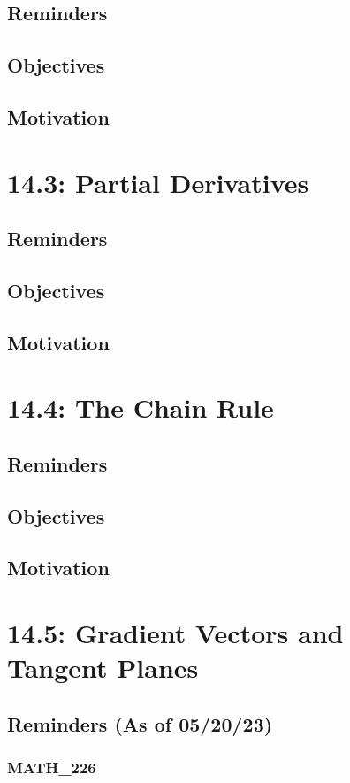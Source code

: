 \documentclass{report}
\begin{document}
\begin{sloppypar}
\section{Reminders}
\section{Objectives}
\section{Motivation}
\chapter{14.3: Partial Derivatives}
\section{Reminders}
\section{Objectives}
\section{Motivation}
\chapter{14.4: The Chain Rule}
\section{Reminders}
\section{Objectives}
\section{Motivation}
\chapter{14.5: Gradient Vectors and Tangent Planes}
\section{Reminders (As of 05/20/23)}
\subsection{MATH\_226}

\end{sloppypar}
\end{document}
